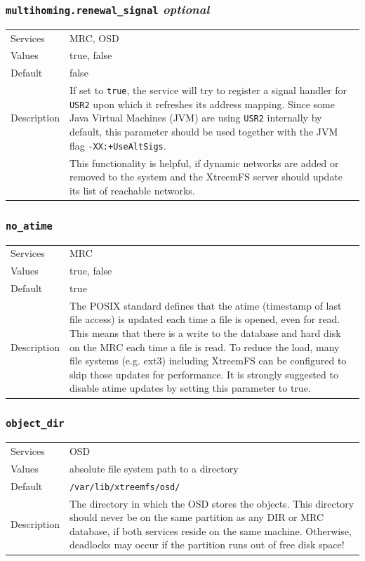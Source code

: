 \documentclass[a4paper,10pt]{book}
\begin{document}
\subsubsection{\texttt{multihoming.renewal\_signal} \textit{optional}}
\label{option:multihoming.renewalsignal}
\begin{tabular}{lp{10cm}}
 Services & MRC, OSD\\
 Values   & true, false\\
 Default  & false\\
 Description & If set to \texttt{true}, the service will try to register a signal handler for \texttt{USR2} upon which it refreshes its address mapping. Since some  Java Virtual Machines (JVM) are using \texttt{USR2} internally by default, this parameter should be used together with the JVM flag \texttt{-XX:+UseAltSigs}.\\
 & This functionality is helpful, if dynamic networks are added or removed to the system and the XtreemFS server should update its list of reachable networks. 
 \end{tabular}

\subsubsection{\texttt{no\_atime}}
\begin{tabular}{lp{10cm}}
 Services & MRC\\
 Values   & true, false \\
 Default  & true\\
 Description & The POSIX standard defines that the atime (timestamp of last file access) is updated each time a file is opened, even for read. This means that there is a write to the database and hard disk on the MRC each time a file is read. To reduce the load, many file systems (e.g. ext3) including XtreemFS can be configured to skip those updates for performance. It is strongly suggested to disable atime updates by setting this parameter to true.
\end{tabular}

\subsubsection{\texttt{object\_dir}}
\begin{tabular}{lp{10cm}}
 Services & OSD\\
 Values   & absolute file system path to a directory\\
 Default  & \texttt{/var/lib/xtreemfs/osd/}\\
 Description & The directory in which the OSD stores the objects. This directory should never be on the same partition as any DIR or MRC database, if both services reside on the same machine. Otherwise, deadlocks may occur if the partition runs out of free disk space!
\end{tabular}
\end{document}
